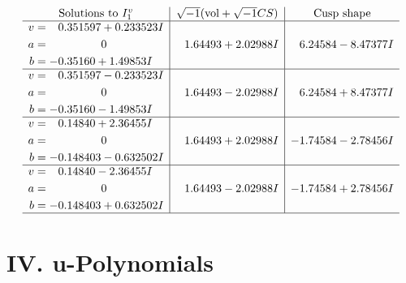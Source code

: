 \documentclass[1p]{elsarticle_modified}
\theoremstyle{definition}
\newcommand{\I}{\sqrt{-1}}
\begin{document}
$$\begin{array}{c|c|c}  
\text{Solutions to }I^v_{1}& \I (\text{vol} + \sqrt{-1}CS) & \text{Cusp shape}\\
 \hline 
\begin{aligned}
v &= \phantom{-}0.351597 + 0.233523 I \\
a &= \phantom{-0.000000 } 0 \\
b &= -0.35160 + 1.49853 I\end{aligned}
 & \phantom{-}1.64493 + 2.02988 I & \phantom{-}6.24584 - 8.47377 I \\ \hline\begin{aligned}
v &= \phantom{-}0.351597 - 0.233523 I \\
a &= \phantom{-0.000000 } 0 \\
b &= -0.35160 - 1.49853 I\end{aligned}
 & \phantom{-}1.64493 - 2.02988 I & \phantom{-}6.24584 + 8.47377 I \\ \hline\begin{aligned}
v &= \phantom{-}0.14840 + 2.36455 I \\
a &= \phantom{-0.000000 } 0 \\
b &= -0.148403 - 0.632502 I\end{aligned}
 & \phantom{-}1.64493 + 2.02988 I & -1.74584 - 2.78456 I \\ \hline\begin{aligned}
v &= \phantom{-}0.14840 - 2.36455 I \\
a &= \phantom{-0.000000 } 0 \\
b &= -0.148403 + 0.632502 I\end{aligned}
 & \phantom{-}1.64493 - 2.02988 I & -1.74584 + 2.78456 I\\
 \hline 
 \end{array}$$\newpage
\newpage\renewcommand{\arraystretch}{1}
\centering \section*{ IV. u-Polynomials}
\end{document}
